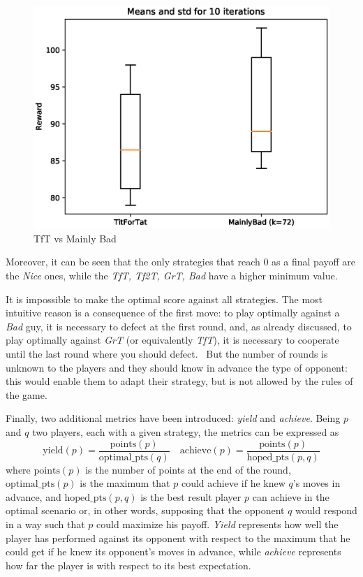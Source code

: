 \documentclass[journal,10pt,twoside]{IEEEtran}
\begin{document}
\begin{figure}[!ht]
    \centering
    \includegraphics[width=.7\columnwidth]{../img/ipd2p/ipd2p-boxplot-TitForTat-MainlyBad(k=72)}
    \caption{TfT vs Mainly Bad}
    \label{fig:boxmbvtft}
\end{figure}

Moreover, it can be seen that the only strategies that reach $0$ as a final payoff are the \textit{Nice} ones, while the \textit{TfT, Tf2T, GrT, Bad} have a higher minimum value.

It is impossible to make the optimal score against all strategies. The most intuitive reason is a consequence of the first move: to play optimally against a \textit{Bad} guy, it is necessary to defect at the first round, and, as already discussed, to play optimally against \textit{GrT} (or equivalently \textit{TfT}), it is necessary to cooperate until the last round where you should defect.~\cite{mathieu2017}
But the number of rounds is unknown to the players and they should know in advance the type of opponent: this would enable them to adapt their strategy, but is not allowed by the rules of the game. 

Finally, two additional metrics have been introduced: \textit{yield} and \textit{achieve}. 
Being $p$ and $q$ two players, each with a given strategy, the metrics can be expressed as
$$
\mathrm{yield}(p) = \frac{\mathrm{points}(p)}{\mathrm{optimal\_pts}(q)} \quad
\mathrm{achieve}(p) = \frac{\mathrm{points}(p)}{\mathrm{hoped\_pts}(p,q)}
$$
where $\mathrm{points}(p)$ is the number of points at the end of the round,
$\mathrm{optimal\_pts}(p)$ is the maximum that $p$ could achieve if he knew $q$'s moves in advance, and
$\mathrm{hoped\_pts}(p,q)$ is the best result player $p$ can achieve in the optimal scenario or, in other words, supposing that the opponent $q$ would respond in a way such that $p$ could maximize his payoff.
\textit{Yield} represents how well the player has performed against its opponent with respect to the maximum that he could get if he knew its opponent's moves in advance, while \textit{achieve} represents how far the player is with respect to its best expectation.
\end{document}
